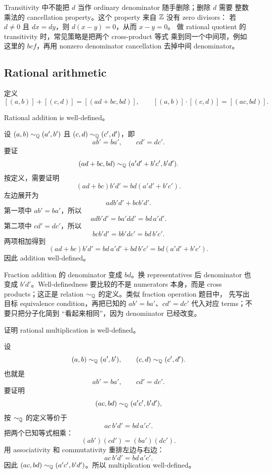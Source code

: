 \begin{explanation}
Transitivity 中不能把 \(d\) 当作 ordinary denominator 随手删除；删除 \(d\) 需要
整数乘法的 cancellation property。这个 property 来自 \(\mathbb{Z}\) 没有 zero divisors：
若 \(d\neq0\) 且 \(dx=dy\)，则 \(d(x-y)=0\)，从而 \(x-y=0\)。
做 rational quotient 的 transitivity 时，常见策略是把两个 cross-product 等式
乘到同一个中间项，例如这里的 \(bcf\)，再用 nonzero denominator cancellation
去掉中间 denominator。
\end{explanation}

\subsection{Rational arithmetic}

定义
\[
  [(a,b)]+[(c,d)]=[(ad+bc,bd)],\qquad
  [(a,b)]\cdot[(c,d)]=[(ac,bd)].
\]

\begin{proposition}
Rational addition is well-defined。
\end{proposition}

\begin{solution}
设 \((a,b)\sim_{\mathbb{Q}}(a',b')\) 且 \((c,d)\sim_{\mathbb{Q}}(c',d')\)，即
\[
  ab'=ba',\qquad cd'=dc'.
\]
要证
\[
  (ad+bc,bd)\sim_{\mathbb{Q}}(a'd'+b'c',b'd').
\]
按定义，需要证明
\[
  (ad+bc)b'd'=bd(a'd'+b'c').
\]
左边展开为
\[
  adb'd'+bcb'd'.
\]
第一项中 \(ab'=ba'\)，所以
\[
  adb'd'=ba'dd'=bd\,a'd'.
\]
第二项中 \(cd'=dc'\)，所以
\[
  bcb'd'=bb'dc'=bd\,b'c'.
\]
两项相加得到
\[
  (ad+bc)b'd'=bd\,a'd'+bd\,b'c'=bd(a'd'+b'c').
\]
因此 addition well-defined。
\end{solution}

\begin{explanation}
Fraction addition 的 denominator 变成 \(bd\)。换 representatives 后 denominator
也变成 \(b'd'\)。Well-definedness 要比较的不是 numerators 本身，而是 cross
products；这正是 relation \(\sim_{\mathbb{Q}}\) 的定义。类似 fraction operation 题目中，
先写出目标 equivalence condition，再把已知的 \(ab'=ba'\)、\(cd'=dc'\) 代入对应
terms；不要只把分子化简到 ``看起来相同''，因为 denominator 已经改变。
\end{explanation}

\begin{exerciseblock}
证明 rational multiplication is well-defined。
\end{exerciseblock}

\begin{solution}
设
\[
  (a,b)\sim_{\mathbb{Q}}(a',b'),\qquad (c,d)\sim_{\mathbb{Q}}(c',d').
\]
也就是
\[
  ab'=ba',\qquad cd'=dc'.
\]
要证明
\[
  (ac,bd)\sim_{\mathbb{Q}}(a'c',b'd'),
\]
按 \(\sim_{\mathbb{Q}}\) 的定义等价于
\[
  ac\,b'd'=bd\,a'c'.
\]
把两个已知等式相乘：
\[
  (ab')(cd')=(ba')(dc').
\]
用 associativity 和 commutativity 重排左边与右边：
\[
  ac\,b'd'=bd\,a'c'.
\]
因此 \((ac,bd)\sim_{\mathbb{Q}}(a'c',b'd')\)。所以 multiplication well-defined。
\end{solution}

